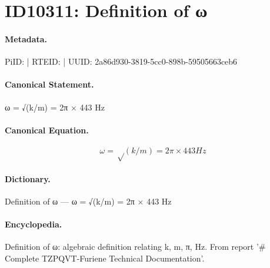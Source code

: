 \section*{ID10311: Definition of ω}
\paragraph{Metadata.}
PiID:  | RTEID:  | UUID: 2a86d930-3819-5cc0-898b-59505663ceb6

\paragraph{Canonical Statement.}
ω = √(k/m) = 2π × 443 Hz

\paragraph{Canonical Equation.}
\[
ω = √(k/m) = 2π × 443 Hz
\]

\paragraph{Dictionary.}
Definition of ω — ω = √(k/m) = 2π × 443 Hz

\paragraph{Encyclopedia.}
Definition of ω: algebraic definition relating k, m, π, Hz. From report '\# Complete TZPQVT-Furiene Technical Documentation'.
